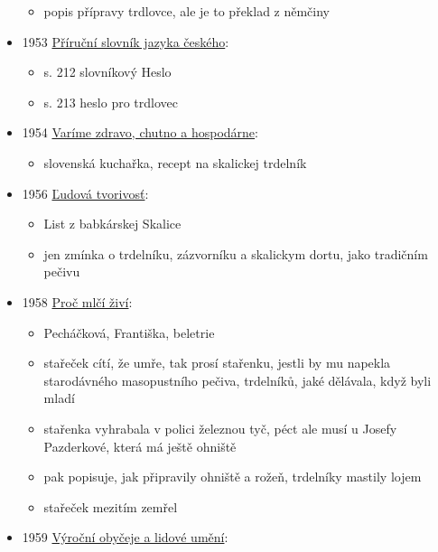\begin{itemize}
  \begin{itemize}
  \tightlist
  \item
    popis přípravy trdlovce, ale je to překlad z němčiny
  \end{itemize}
\item
  1953
  \href{https://ceskadigitalniknihovna.cz/uuid/uuid:b65792bb-dbc4-4d41-b1da-e0aec484459d}{Příruční
  slovník jazyka českého}:

  \begin{itemize}
  \tightlist
  \item
    s. 212 slovníkový Heslo
  \item
    s. 213 heslo pro trdlovec
  \end{itemize}
\item
  1954
  \href{https://dikda.snk.sk/uuid/uuid:38df4d2e-5eea-4484-9e22-e5a1080ba4e3}{Varíme
  zdravo, chutno a hospodárne}:

  \begin{itemize}
  \tightlist
  \item
    slovenská kuchařka, recept na skalickej trdelník
  \end{itemize}
\item
  1956
  \href{https://dikda.snk.sk/uuid/uuid:906d894f-daa0-4fa8-9756-804e856a0d44}{Ľudová
  tvorivosť}:

  \begin{itemize}
  \tightlist
  \item
    List z babkárskej Skalice
  \item
    jen zmínka o trdelníku, zázvorníku a skalickym dortu, jako tradičním
    pečivu
  \end{itemize}
\item
  1958
  \href{https://ceskadigitalniknihovna.cz/uuid/uuid:4d82e3c0-db26-11e2-9923-005056827e52}{Proč
  mlčí živí}:

  \begin{itemize}
  \tightlist
  \item
    Pecháčková, Františka, beletrie
  \item
    stařeček cítí, že umře, tak prosí stařenku, jestli by mu napekla
    starodávného masopustního pečiva, trdelníků, jaké dělávala, když
    byli mladí
  \item
    stařenka vyhrabala v polici železnou tyč, péct ale musí u Josefy
    Pazderkové, která má ještě ohniště
  \item
    pak popisuje, jak připravily ohniště a rožeň, trdelníky mastily
    lojem
  \item
    stařeček mezitím zemřel
  \end{itemize}
\item
  1959
  \href{https://ceskadigitalniknihovna.cz/uuid/uuid:d7bb5685-7a29-11ed-b508-001b63bd97ba}{Výroční
  obyčeje a lidové umění}:


\end{itemize}
